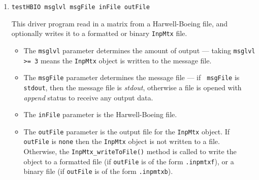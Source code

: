 \begin{enumerate}
\begin{itemize}
{\tt 1} for $y := \beta y + \alpha A^T x$ or
{\tt 2} for $y := \beta y + \alpha A^H x$.
\item
{\tt nrowA} is the number of rows in $A$
\item
{\tt ncolA} is the number of columns in $A$
\item
{\tt nitem} is the number of matrix entries that are 
assembled into the matrix.
\item
The {\tt seed} parameter is a random number seed used to fill the
matrix entries with random numbers.
\item
{\tt alphaReal} and {\tt alphaImag} 
form the $\alpha$ scalar in the multiply.
\item
{\tt betaReal} and {\tt betaImag} 
form the $\beta$ scalar in the multiply.
\end{itemize}
\item
\begin{verbatim}
testHBIO msglvl msgFile inFile outFile
\end{verbatim}
This driver program read in a matrix from a Harwell-Boeing file,
and optionally writes it to a formatted or binary {\tt InpMtx} file.
\par
\begin{itemize}
\item
The {\tt msglvl} parameter determines the amount of output ---
taking {\tt msglvl >= 3} means the {\tt InpMtx} object is written
to the message file.
\item
The {\tt msgFile} parameter determines the message file --- if {\tt
msgFile} is {\tt stdout}, then the message file is {\it stdout},
otherwise a file is opened with {\it append} status to receive any
output data.
\item
The {\tt inFile} parameter is the Harwell-Boeing file.
\item
The {\tt outFile} parameter is the output file for the {\tt InpMtx}
object. 
If {\tt outFile} is {\tt none} then the {\tt InpMtx} object is not
written to a file. 
Otherwise, the {\tt InpMtx\_writeToFile()} method is called to write
the object to 
a formatted file (if {\tt outFile} is of the form {\tt *.inpmtxf}),
or
a binary file (if {\tt outFile} is of the form {\tt *.inpmtxb}).
\end{itemize}
\end{enumerate}
